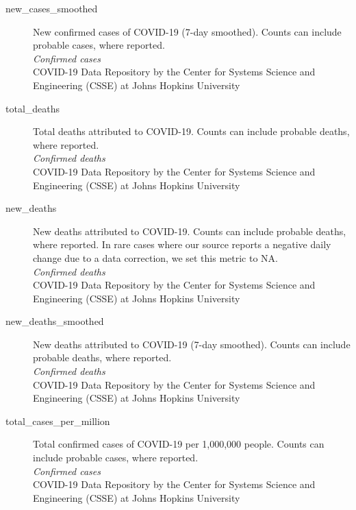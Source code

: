 \begin{description}
    \item[new\_cases\_smoothed] 
    New confirmed cases of COVID-19 (7-day smoothed). Counts can include probable cases, where reported.\\
    \emph{\footnotesize{Confirmed cases}}\\
    \footnotesize{COVID-19 Data Repository by the Center for Systems Science and Engineering (CSSE) at Johns Hopkins University}\\

    \item[total\_deaths] 
    Total deaths attributed to COVID-19. Counts can include probable deaths, where reported.\\
    \emph{\footnotesize{Confirmed deaths}}\\
    \footnotesize{COVID-19 Data Repository by the Center for Systems Science and Engineering (CSSE) at Johns Hopkins University}\\

    \item[new\_deaths] 
    New deaths attributed to COVID-19. Counts can include probable deaths, where reported. In rare cases where our source reports a negative daily change due to a data correction, we set this metric to NA.\\
    \emph{\footnotesize{Confirmed deaths}}\\
    \footnotesize{COVID-19 Data Repository by the Center for Systems Science and Engineering (CSSE) at Johns Hopkins University}\\

    \item[new\_deaths\_smoothed] 
    New deaths attributed to COVID-19 (7-day smoothed). Counts can include probable deaths, where reported.\\
    \emph{\footnotesize{Confirmed deaths}}\\
    \footnotesize{COVID-19 Data Repository by the Center for Systems Science and Engineering (CSSE) at Johns Hopkins University}\\

    \item[total\_cases\_per\_million] 
    Total confirmed cases of COVID-19 per 1,000,000 people. Counts can include probable cases, where reported.\\
    \emph{\footnotesize{Confirmed cases}}\\
    \footnotesize{COVID-19 Data Repository by the Center for Systems Science and Engineering (CSSE) at Johns Hopkins University}\\


\end{description}
